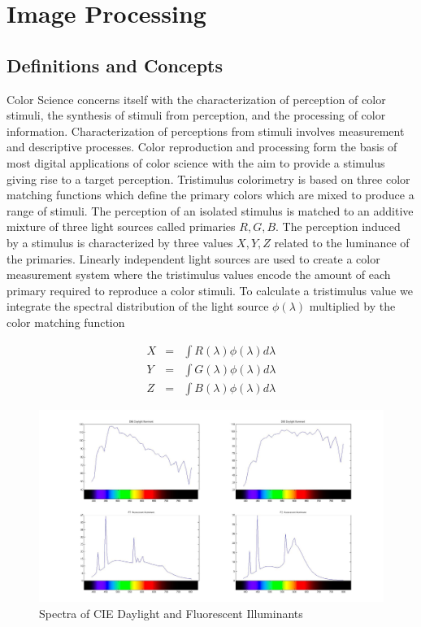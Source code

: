 \chapter{Image Processing}


\section{Definitions and Concepts}
Color Science concerns itself with the characterization of perception of color stimuli, the synthesis of stimuli from perception, and the processing of color information.  Characterization of perceptions from stimuli involves measurement and descriptive processes.  Color reproduction and processing form the basis of most digital applications of color science with the aim to provide a stimulus giving rise to a target perception.  Tristimulus colorimetry is based on three color matching functions which define the primary colors which are mixed to produce a range of stimuli.  The perception of an isolated stimulus is matched to an additive mixture of three light sources called primaries $R, G, B$.  The perception induced by a stimulus is characterized by three values $X, Y, Z$ related to the luminance of the primaries.  Linearly independent light sources are used to create a color measurement system where the tristimulus values encode the amount of each primary required to reproduce a color stimuli.  To calculate a tristimulus value we integrate the spectral distribution of the light source $\phi(\lambda)$ multiplied by the color matching function

\begin{eqnarray*}
\nonumber
  X &=& \int R(\lambda) \phi(\lambda) d\lambda  \\
  Y &=& \int G(\lambda) \phi(\lambda) d\lambda \\
  Z &=& \int B(\lambda) \phi(\lambda) d\lambda
\end{eqnarray*}

\begin{figure}
  \caption{Spectra of CIE Daylight and Fluorescent Illuminants}
  \begin{center}
\includegraphics[width=12.0cm]{ColorPaper/daylight_Flourcescent.jpg}
  \end{center}
\end{figure}

